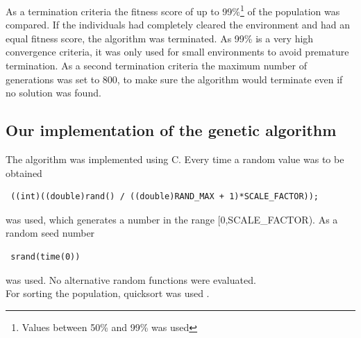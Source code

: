 As a termination criteria the fitness score of up to 99\%\footnote{Values between 50\% and 99\% was used} of the population was compared. If the individuals had completely cleared the environment and had an equal fitness score, the algorithm was terminated. As 99\% is a very high convergence criteria, it was only used for small environments to avoid premature termination. As a second termination criteria the maximum number of generations was set to 800, to make sure the algorithm would terminate even if no solution was found.
\subsection{Our implementation of the genetic algorithm}
The algorithm was implemented using C. Every time a random value was to be obtained \begin{verbatim} ((int)((double)rand() / ((double)RAND_MAX + 1)*SCALE_FACTOR)); \end{verbatim} was used, which generates a number in the range [0,SCALE\_FACTOR). As a random seed number \begin{verbatim} srand(time(0))\end{verbatim} was used. No alternative random functions were evaluated.\\
For sorting the population, quicksort was used \cite{quicksort}.\\